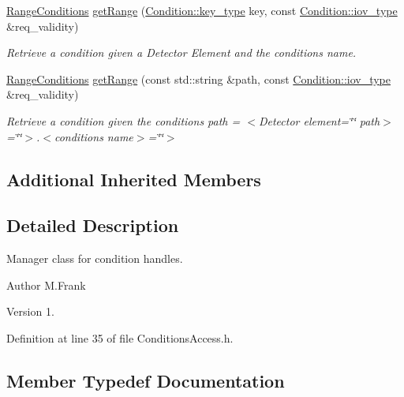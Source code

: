 \begin{DoxyCompactItemize}
\hyperlink{namespace_d_d4hep_1_1_conditions_ae765f0140a33973a430280f02b6062f4}{Range\+Conditions} \hyperlink{class_d_d4hep_1_1_conditions_1_1_conditions_access_aa5f5712c3083cec42a3cd49d86924611}{get\+Range} (\hyperlink{class_d_d4hep_1_1_conditions_1_1_condition_a7528efa762e8cc072ef80ea67c3531f9}{Condition\+::key\+\_\+type} key, const \hyperlink{class_d_d4hep_1_1_conditions_1_1_condition_ad84300e226b2085ec5e9db7f47be5539}{Condition\+::iov\+\_\+type} \&req\+\_\+validity)
\begin{DoxyCompactList}\small\item\em Retrieve a condition given a Detector Element and the conditions name. \end{DoxyCompactList}\item 
\hyperlink{namespace_d_d4hep_1_1_conditions_ae765f0140a33973a430280f02b6062f4}{Range\+Conditions} \hyperlink{class_d_d4hep_1_1_conditions_1_1_conditions_access_a67b7e2ddb0c713445cb34d4217782bce}{get\+Range} (const std\+::string \&path, const \hyperlink{class_d_d4hep_1_1_conditions_1_1_condition_ad84300e226b2085ec5e9db7f47be5539}{Condition\+::iov\+\_\+type} \&req\+\_\+validity)
\begin{DoxyCompactList}\small\item\em Retrieve a condition given the conditions path = $<$\+Detector element=\char`\"{}\char`\"{} path$>$=\char`\"{}\char`\"{}$>$.$<$conditions name$>$=\char`\"{}\char`\"{}$>$ \end{DoxyCompactList}\end{DoxyCompactItemize}
\subsection*{Additional Inherited Members}


\subsection{Detailed Description}
Manager class for condition handles. 

\begin{DoxyAuthor}{Author}
M.\+Frank 
\end{DoxyAuthor}
\begin{DoxyVersion}{Version}
1. 
\end{DoxyVersion}


Definition at line 35 of file Conditions\+Access.\+h.



\subsection{Member Typedef Documentation}
\hypertarget{class_d_d4hep_1_1_conditions_1_1_conditions_access_a5d82a416d51349abaf6075b2028faecc}{}\label{class_d_d4hep_1_1_conditions_1_1_conditions_access_a5d82a416d51349abaf6075b2028faecc} 
